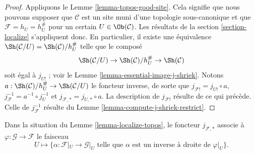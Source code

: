 \begin{proof}
Appliquons le Lemme \ref{lemma-topos-good-site}.
Cela signifie que nous pouvons supposer que $\mathcal{C}$ est un site muni
d’une topologie sous-canonique et que $\mathcal{F} = h_U = h_U^\#$ pour un
certain $U \in \Ob(\mathcal{C})$.
Les résultats de la section \ref{section-localize} s’appliquent donc. En
particulier, il existe une équivalence
$\Sh(\mathcal{C}/U) = \Sh(\mathcal{C})/h_U^\#$ telle que le composé
$$
\Sh(\mathcal{C}/U)
\to
\Sh(\mathcal{C})/h_U^\#
\to \Sh(\mathcal{C})
$$
soit égal à $j_{U!}$ ; voir le
Lemme \ref{lemma-essential-image-j-shriek}.
Notons $a : \Sh(\mathcal{C})/h_U^\# \to \Sh(\mathcal{C}/U)$ le foncteur
inverse, de sorte que $j_{\mathcal{F}!} = j_{U!} \circ a$,
$j_\mathcal{F}^{-1} = a^{-1} \circ j_U^{-1}$ et
$j_{\mathcal{F}, *} = j_{U, *} \circ a$. La description de
$j_{\mathcal{F}!}$ résulte de ce qui précède. Celle de
$j_\mathcal{F}^{-1}$ résulte du
Lemme \ref{lemma-compute-j-shriek-restrict}.
\end{proof}

\begin{lemma}
\label{lemma-localize-pushforward}
Dans la situation du Lemme \ref{lemma-localize-topos}, le foncteur
$j_{\mathcal{F}, *}$ associe à
$\varphi : \mathcal{G} \to \mathcal{F}$ le faisceau
$$
U
\longmapsto
\{\alpha : \mathcal{F}|_U \to \mathcal{G}|_U
\text{ telle que } \alpha \text{ est un inverse à droite de }\varphi|_U \}.
$$
\end{lemma}

